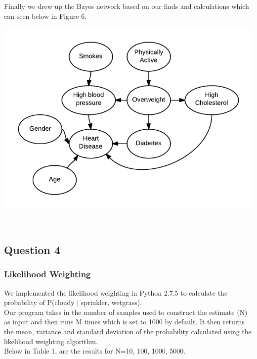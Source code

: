 \documentclass{article}
\begin{document}
Finally we drew up the Bayes network based on our finds and calculations which can seen below in Figure 6.

\begin{minipage}{\linewidth}
\begin{center}
\includegraphics[scale=0.5]{part3_bn}
\end{center}
\end{minipage}\\

\subsection{Question 4}
\subsubsection{Likelihood Weighting}

We implemented the likelihood weighting in Python 2.7.5 to calculate the probability of P(cloudy $|$ sprinkler, wetgrass). \\

Our program takes in the number of samples used to construct the estimate (N) as input and then runs M times which is set to 1000 by default. It then returns the mean, variance and standard deviation of the probability calculated using the likelihood weighting algorithm.\\

Below in Table 1, are the results for N=10, 100, 1000, 5000.
\end{document}
